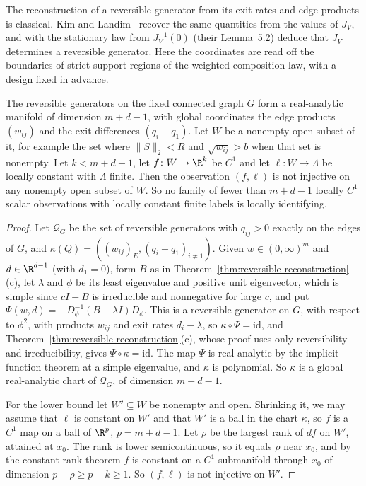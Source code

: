 The reconstruction of a reversible generator from its exit rates and edge
products is classical. Kim and Landim~\cite[Lemma~5.1 and Corollary~5.3]{kl2024}
recover the same quantities from the values of $J_V$, and with the stationary law
from $J_V^{-1}(0)$ (their Lemma~5.2) deduce that $J_V$ determines a reversible
generator. Here the coordinates are read off the
boundaries of strict support regions of the weighted composition law, with a
design fixed in advance.

\begin{theorem}[minimality]\label{thm:minimality}
The reversible generators on the fixed connected graph $G$ form a real-analytic
manifold of dimension $m+d-1$, with global coordinates the edge products
$(w_{ij})$ and the exit differences $(q_i-q_1)$. Let $W$ be a nonempty open
subset of it, for example the set where $\|S\|_2<R$ and $\sqrt{w_{ij}}>b$ when
that set is nonempty. Let $k<m+d-1$, let $f\colon W\to\R^k$ be $C^1$ and let
$\ell\colon W\to\Lambda$ be locally constant with $\Lambda$ finite. Then the
observation $(f,\ell)$ is not injective on any nonempty open subset of $W$. So no
family of fewer than $m+d-1$ locally $C^1$ scalar observations with locally
constant finite labels is locally identifying.
\end{theorem}

\begin{proof}
Let $\mathcal Q_G$ be the set of reversible generators with $q_{ij}>0$
exactly on the edges of $G$, and $\kappa(Q)=((w_{ij})_E,(q_i-q_1)_{i\ne1})$.
Given $w\in(0,\infty)^m$ and $d\in\R^{d-1}$ (with $d_1=0$), form $B$ as in
Theorem~\ref{thm:reversible-reconstruction}(c), let $\lambda$ and $\phi$ be its least
eigenvalue and positive unit eigenvector, which is simple since $cI-B$ is
irreducible and nonnegative for large $c$, and put
$\Psi(w,d)=-D_\phi^{-1}(B-\lambda I)D_\phi$. This is a reversible generator on
$G$, with respect to $\phi^2$, with products $w_{ij}$ and exit rates
$d_i-\lambda$, so $\kappa\circ\Psi=\mathrm{id}$, and
Theorem~\ref{thm:reversible-reconstruction}(c), whose proof uses only
reversibility and irreducibility, gives $\Psi\circ\kappa=\mathrm{id}$. The map
$\Psi$ is real-analytic by the implicit function theorem at a simple
eigenvalue, and $\kappa$ is polynomial. So $\kappa$ is a global real-analytic
chart of $\mathcal Q_G$, of dimension $m+d-1$.

For the lower bound let $W'\subseteq W$ be nonempty and open. Shrinking it, we
may assume that $\ell$ is constant on $W'$ and that $W'$ is a ball in the chart
$\kappa$, so $f$ is a $C^1$ map on a ball of $\R^p$, $p=m+d-1$. Let $\rho$ be the
largest rank of $df$ on $W'$, attained at $x_0$. The rank is lower
semicontinuous, so it equals $\rho$ near $x_0$, and by the constant rank theorem
$f$ is constant on a $C^1$ submanifold through $x_0$ of dimension
$p-\rho\ge p-k\ge1$. So $(f,\ell)$ is not injective on $W'$.
\end{proof}


